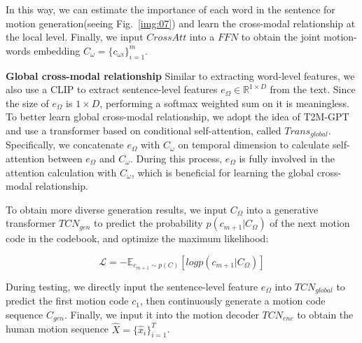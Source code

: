 \documentclass[10pt,twocolumn,letterpaper]{article}
\begin{document}
In this way, we can estimate the importance of each word in the sentence for motion generation(seeing Fig.~\ref{img:07}) and learn the cross-modal relationship at the local level. Finally, we input $CrossAtt$ into a $FFN$ to obtain the joint motion-words embedding $C_\omega=\{c_{\omega i}\}_{i=1}^m$.

\textbf{Global cross-modal relationship}\quad
Similar to extracting word-level features, we also use a CLIP to extract sentence-level features $e_\Omega \in \mathbb{R}^{1 \times D}$ from the text. Since the size of $e_\Omega$ is $1 \times D$, performing a softmax weighted sum on it is meaningless. To better learn global cross-modal relationship, we adopt the idea of T2M-GPT~\cite{zhang2023t2m} and use a transformer based on conditional self-attention, called $ {Trans_{global}}$. Specifically, we concatenate $e_\Omega$ with $C_\omega$ on temporal dimension to calculate self-attention between $e_\Omega$ and $C_\omega$. During this process, $e_\Omega$ is fully involved in the attention calculation with $C_\omega$, which is beneficial for learning the global cross-modal relationship. 

To obtain more diverse generation results, we input $C_\Omega$ into a generative transformer $ {TCN_{gen}}$ to predict the probability $p(c_{m+1}|C_{\Omega})$ of the next motion code in the codebook, and optimize the maximum likelihood:

\begin{equation}
\mathcal{L} = -\mathbb{E}_{c_{m+1} \sim p(C)}[log p(c_{m+1}|C_{\Omega})]
\label{euqa:05_15}
\end{equation}

During testing, we directly input the sentence-level feature $e_\Omega$ into $ {TCN_{global}}$ to predict the first motion code $c_1$, then continuously generate a motion code sequence $C_{gen}$. Finally, we input it into the motion decoder $ {TCN_{enc}}$ to obtain the human motion sequence $\hat{X}=\{\hat{x}_i\}_{i=1}^T$.
\end{document}
